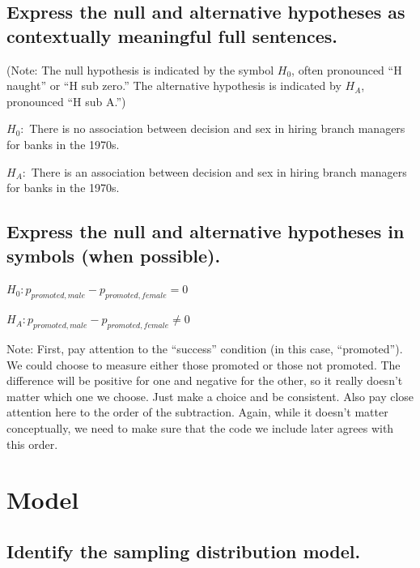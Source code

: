 \documentclass[
]{book}
\begin{document}
\hypertarget{hypothesis1-ex-express-words}{%
\subsection{Express the null and alternative hypotheses as contextually meaningful full sentences.}\label{hypothesis1-ex-express-words}}

(Note: The null hypothesis is indicated by the symbol \(H_{0}\), often pronounced ``H naught'' or ``H sub zero.'' The alternative hypothesis is indicated by \(H_{A}\), pronounced ``H sub A.'')

\(H_{0}:\) There is no association between decision and sex in hiring branch managers for banks in the 1970s.

\(H_{A}:\) There is an association between decision and sex in hiring branch managers for banks in the 1970s.

\hypertarget{hypothesis1-ex-express-math}{%
\subsection{Express the null and alternative hypotheses in symbols (when possible).}\label{hypothesis1-ex-express-math}}

\(H_{0}: p_{promoted, male} - p_{promoted, female} = 0\)

\(H_{A}: p_{promoted, male} - p_{promoted, female} \neq 0\)

Note: First, pay attention to the ``success'' condition (in this case, ``promoted''). We could choose to measure either those promoted or those not promoted. The difference will be positive for one and negative for the other, so it really doesn't matter which one we choose. Just make a choice and be consistent. Also pay close attention here to the order of the subtraction. Again, while it doesn't matter conceptually, we need to make sure that the code we include later agrees with this order.

\hypertarget{hypothesis1-ex-model}{%
\section{Model}\label{hypothesis1-ex-model}}

\hypertarget{hypothesis1-ex-sampling-dist-model}{%
\subsection{Identify the sampling distribution model.}\label{hypothesis1-ex-sampling-dist-model}}
\end{document}
